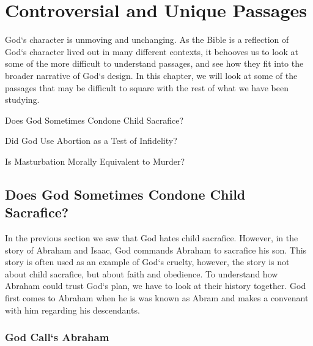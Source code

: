 \chapter{Controversial and Unique Passages}
\begin{fullwidth}
    
God`s character is unmoving and unchanging. As the Bible is a reflection of God`s character lived out in many different contexts, 
it behooves us to look at some of the more difficult to understand passages, and see how they fit into the broader narrative of God`s design. 
In this chapter, we will look at some of the passages that may be difficult to square with the rest of what we have been studying. 


\vspace{2\baselineskip}

Does God Sometimes Condone Child Sacrafice?

\vspace{1\baselineskip}

Did God Use Abortion as a Test of Infidelity?

\vspace{1\baselineskip}

Is Masturbation Morally Equivalent to Murder?

\end{fullwidth}





\pagebreak

\section{Does God Sometimes Condone Child Sacrafice?}
\begin{fullwidth}
    In the previous section we saw that God hates child sacrafice. However, in the story of Abraham and Isaac, God commands Abraham to sacrafice
    his son. This story is often used as an example of God`s cruelty, however, the story is not about child sacrafice, but about faith and obedience.
    To understand how Abraham could trust God`s plan, we have to look at their history together. God first comes to Abraham when he is was known as Abram and makes a convenant with him regarding his descendants.
\end{fullwidth}
\subsection{God Call`s Abraham}

